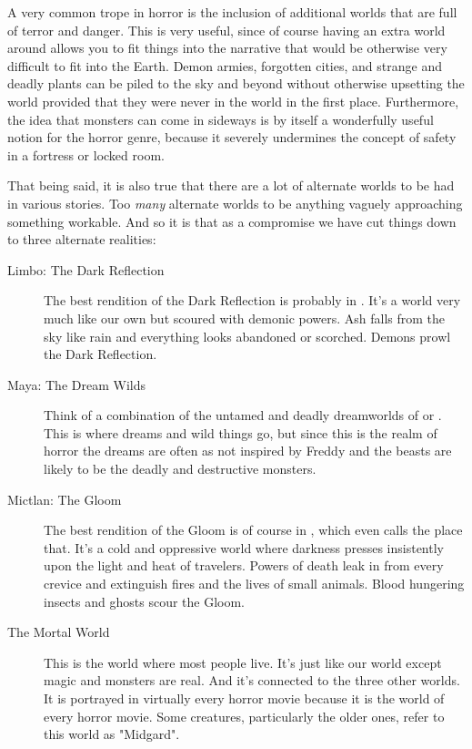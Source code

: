 A very common trope in horror is the inclusion of additional worlds that are full of terror and danger. This is very useful, since of course having an extra world around allows you to fit things into the narrative that would be otherwise very difficult to fit into the Earth. Demon armies, forgotten cities, and strange and deadly plants can be piled to the sky and beyond without otherwise upsetting the world provided that they were never in the world in the first place. Furthermore, the idea that monsters can come in sideways is by itself a wonderfully useful notion for the horror genre, because it severely undermines the concept of safety in a fortress or locked room.

That being said, it is also true that there are a lot of alternate worlds to be had in various stories. Too \textit{many} alternate worlds to be anything vaguely approaching something workable. And so it is that as a compromise we have cut things down to three alternate realities:

\begin{description}
\item[Limbo: The Dark Reflection] The best rendition of the Dark Reflection is probably in . It's a world very much like our own but scoured with demonic powers. Ash falls from the sky like rain and everything looks abandoned or scorched. Demons prowl the Dark Reflection.
\item[Maya: The Dream Wilds] Think of a combination of the untamed and deadly dreamworlds of  or . This is where dreams and wild things go, but since this is the realm of horror the dreams are often as not inspired by Freddy and the beasts are likely to be the deadly and destructive monsters.
\item[Mictlan: The Gloom] The best rendition of the Gloom is of course in , which even calls the place that. It's a cold and oppressive world where darkness presses insistently upon the light and heat of travelers. Powers of death leak in from every crevice and extinguish fires and the lives of small animals. Blood hungering insects and ghosts scour the Gloom.
\item[The Mortal World] This is the world where most people live. It's just like our world except magic and monsters are real. And it's connected to the three other worlds. It is portrayed in virtually every horror movie because it is the world of every horror movie. Some creatures, particularly the older ones, refer to this world as "Midgard".
\end{description}

